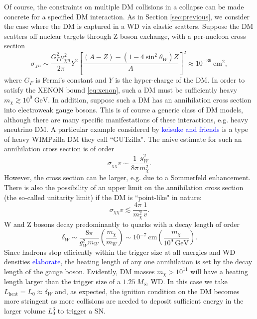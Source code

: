 \documentclass[preprintnumbers,amsmath,amssymb,prd,superscriptaddress]{revtex4}
\newcommand{\GeV}{\text{GeV}}
\newcommand{\cm}{\text{cm}}
\def\r{\right)}
\def\l{\left(}
\begin{document}
Of course, the constraints on multiple DM collisions in a collapse can be made concrete for a specified DM interaction. 
As in Section \ref{sec:previous}, we consider the case where the DM is captured in a WD via elastic scatters. 
Suppose the DM scatters off nuclear targets through Z boson exchange, with a per-nucleon cross section
\begin{equation}
\label{eq:Zscattering}
\sigma_{\chi n} \sim \frac{G_F^2 \mu_{\chi n}^2}{2\pi} Y^2 \left [\frac{(A-Z) - (1-4 \sin^2{\theta_W})Z}{A} \right ]^2 \approx 10^{-39} ~\cm^2,
\end{equation}
where $G_F$ is Fermi's constant and $Y$ is the hyper-charge of the DM. 
In order to satisfy the XENON bound \eqref{eq:xenon}, such a DM must be sufficiently heavy $m_\chi \gtrsim 10^9 ~\GeV$. 
In addition, suppose such a DM has an annihilation cross section into electroweak gauge bosons.
This is of course a generic class of DM models, although there are many specific manifestations of these interactions, e.g. heavy sneutrino DM. 
A particular example considered by \textcolor{blue}{keisuke and friends} is a type of heavy WIMPzilla DM they call ``GUTzilla".
The naive estimate for such an annihilation cross section is of order
\begin{equation}
\sigma_{\chi \chi} v \sim \frac{1}{8\pi} \frac{g_W^2}{m_\chi^2}.
\end{equation}
However, the cross section can be larger, e.g. due to a Sommerfeld enhancement. 
There is also the possibility of an upper limit on the annihilation cross section (the so-called unitarity limit) if the DM is ``point-like" in nature:
\begin{equation}
\sigma_{\chi \chi} v \lesssim \frac{4 \pi}{m_\chi^2} \frac{1}{v}.
\end{equation}
W and Z bosons decay predominantly to quarks with a decay length of order
\begin{equation}
\delta_W \sim \frac{8\pi}{g_W^2 m_W} \l \frac{m_\chi}{m_W} \r \sim 10^{-7} ~\cm \l \frac{m_\chi}{10^{9} ~\GeV} \r. 
\end{equation}
Since hadrons stop efficiently within the trigger size at all energies and WD densities \textcolor{blue}{elaborate}, the heating length of any one annihilation is set by the decay length of the gauge boson. 
Evidently, DM masses $m_\chi > 10^{11}$ will have a heating length larger than the trigger size of a $1.25~M_{\astrosun}$ WD.
In this case we take $L_\text{heat} = L_0 \approx \delta_W$ and, as expected, the ignition condition on the DM becomes more stringent as more collisions are needed to deposit sufficient energy in the larger volume $L_0^3$ to trigger a SN. 
\end{document}
